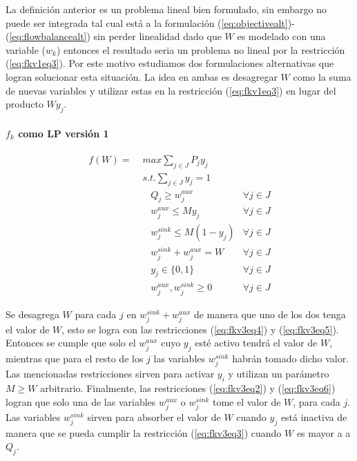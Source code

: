 \documentclass{article}
\begin{document}
  La definición anterior es un problema lineal bien formulado, sin embargo no puede ser integrada tal cual está a la formulación (\ref{eq:objectivealt})-(\ref{eq:flowbalancealt}) sin perder linealidad dado que $W$ es modelado con una variable ($w_k$) entonces el resultado seria un problema no lineal por la restricción (\ref{eq:fkv1eq3}). Por este motivo estudiamos dos formulaciones alternativas que logran solucionar esta situación. La idea en ambas es desagregar $W$ como la suma de nuevas variables y utilizar estas en la restricción (\ref{eq:fkv1eq3}) en lugar del producto $W y_j$.

  \paragraph*{$f_k$ como LP versión 1}

  \begin{align}
    f(W) =\; & max \sum_{j \in J} P_j y_j             & \label{eq:fkv3eq1}\\
             & s.t. \sum_{j \in J} y_j = 1            & \label{eq:fkv3eq2}\\
             & \;\;\; Q_j \geq w^{aux}_j              & \forall j \in J \label{eq:fkv3eq3} \\
             & \;\;\; w^{aux}_j \leq M y_j            & \forall j \in J \label{eq:fkv3eq4} \\
             & \;\;\; w^{sink}_j \leq M (1 - y_j)     & \forall j \in J \label{eq:fkv3eq5} \\
             & \;\;\; w^{sink}_j + w^{aux}_j = W      & \label{eq:fkv3eq6} \forall j \in J\\
             & \;\;\; y_j \in \{0,1\}                 & \label{eq:fkv3domainy} \forall j \in J \\
             & \;\;\; w^{aux}_j, w^{sink}_j \geq 0    & \label{eq:fkv3eq7} \forall j \in J
  \end{align}

  Se desagrega $W$ para cada $j$ en $w^{sink}_j + w^{aux}_j$ de manera que uno de los dos tenga el valor de $W$, esto se logra con las restricciones (\ref{eq:fkv3eq4}) y (\ref{eq:fkv3eq5}). Entonces se cumple que solo el $w^{aux}_j$ cuyo $y_j$ esté activo tendrá el valor de $W$, mientras que para el resto de los $j$ las variables $w^{sink}_j$ habrán tomado dicho valor. Las mencionadas restricciones sirven para activar $y_i$ y utilizan un parámetro $M \geq W$ arbitrario. Finalmente, las restricciones (\ref{eq:fkv3eq2}) y (\ref{eq:fkv3eq6}) logran que solo una de las variables $w^{aux}_j$ o $w^{sink}_j$ tome el valor de $W$, para cada $j$. Las variables $w^{sink}_j$ sirven para absorber el valor de $W$ cuando $y_j$ está inactiva de manera que se pueda cumplir la restricción (\ref{eq:fkv3eq3}) cuando $W$ es mayor a a $Q_j$.
\end{document}
